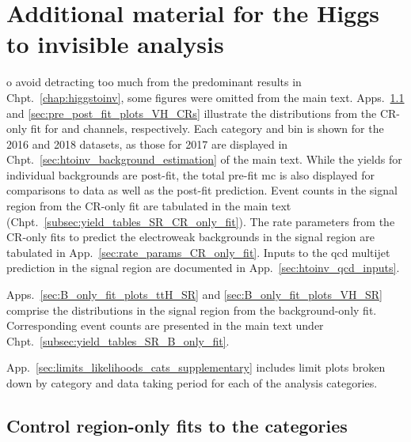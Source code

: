 \chapter{Additional material for the Higgs to invisible analysis}
\label{app:supplementary_hinv_plots}

o avoid detracting too much from the predominant results in Chpt.~\ref{chap:higgstoinv}, some figures were omitted from the main text. Apps.~\ref{sec:pre_post_fit_plots_ttH_CRs} and \ref{sec:pre_post_fit_plots_VH_CRs} illustrate the distributions from the \gls{CR}-only fit for \ttH and \VH channels, respectively. Each category and \ptmiss bin is shown for the 2016 and 2018 datasets, as those for 2017 are displayed in Chpt.~\ref{sec:htoinv_background_estimation} of the main text. While the yields for individual backgrounds are post-fit, the total pre-fit \acrshort{mc} is also displayed for comparisons to data as well as the post-fit prediction. Event counts in the signal region from the \gls{CR}-only fit are tabulated in the main text (Chpt.~\ref{subsec:yield_tables_SR_CR_only_fit}). The rate parameters from the \gls{CR}-only fits to predict the electroweak backgrounds in the signal region are tabulated in App.~\ref{sec:rate_params_CR_only_fit}. Inputs to the \acrshort{qcd} multijet prediction in the signal region are documented in App.~\ref{sec:htoinv_qcd_inputs}.

Apps.~\ref{sec:B_only_fit_plots_ttH_SR} and \ref{sec:B_only_fit_plots_VH_SR} comprise the distributions in the signal region from the background-only fit. Corresponding event counts are presented in the main text under Chpt.~\ref{subsec:yield_tables_SR_B_only_fit}.

App.~\ref{sec:limits_likelihoods_cats_supplementary} includes limit plots broken down by category and data taking period for each of the analysis categories.

\clearpage



\section{Control region-only fits to the \texorpdfstring{\ttH}{ttH} categories}
\label{sec:pre_post_fit_plots_ttH_CRs}

